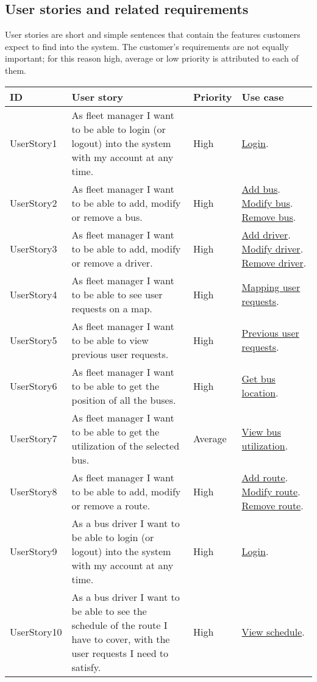 \subsection{User stories and related requirements}
User stories are short and simple sentences that contain the features customers expect to find into the system. The customer's requirements are not equally important; for this reason high, average or low priority is attributed to each of them.
\begin{table}[H]
	\centering
	\begin{tabular}{| m{2.2cm} | m{6cm} | m{1.5cm} | m{2.5cm} |}
		\hline
		\textbf{ID} & \textbf{User story} & \textbf{Priority} & \textbf{Use case}\\
		\hline
		UserStory1 & As fleet manager I want to be able to login (or logout) into the system with my account at any time. & High & \hyperlink{Login_fm}{Login}.\\
		\hline
		UserStory2 & As fleet manager I want to be able to add, modify or remove a bus. & High & \hyperlink{AddBus}{Add bus}. \hyperlink{ModifyBus}{Modify bus}. \hyperlink{RemoveBus}{Remove bus}.\\
		\hline
		UserStory3 & As fleet manager I want to be able to add, modify or remove a driver. & High & \hyperlink{AddDriver}{Add driver}. \hyperlink{ModifyDriver}{Modify driver}. \hyperlink{DeleteDriver}{Remove driver}.\\
		\hline
		UserStory4 & As fleet manager I want to be able to see user requests on a map. & High & \hyperlink{Mapping_user_requests_fm}{Mapping user requests}.\\
		\hline
		UserStory5 & As fleet manager I want to be able to view previous user requests. & High & \hyperlink{PreviousUserRequestsFm}{Previous user requests}.\\
		\hline
		UserStory6 & As fleet manager I want to be able to get the position of all the buses. & High & \hyperlink{Get_bus_location_fm}{Get bus location}.\\
		\hline
		UserStory7 & As fleet manager I want to be able to get the utilization of the selected bus. & Average & \hyperlink{View_bus_utilization_fm}{View bus utilization}.\\
		\hline
		UserStory8 & As fleet manager I want to be able to add, modify or remove a route. & High & \hyperlink{AddRoute}{Add route}. \hyperlink{ModifyRoute}{Modify route}. \hyperlink{DeleteRoute}{Remove route}.\\
		\hline
		UserStory9 & As a bus driver I want to be able to login (or logout) into the system with my account at any time. & High & \hyperlink{Login_bd}{Login}.\\
		\hline
		UserStory10 & As a bus driver I want to be able to see the schedule of the route I have to cover, with the user requests I need to satisfy. & High & \hyperlink{View_schedule_bd}{View schedule}.\\
		\hline
	\end{tabular}
\end{table}

